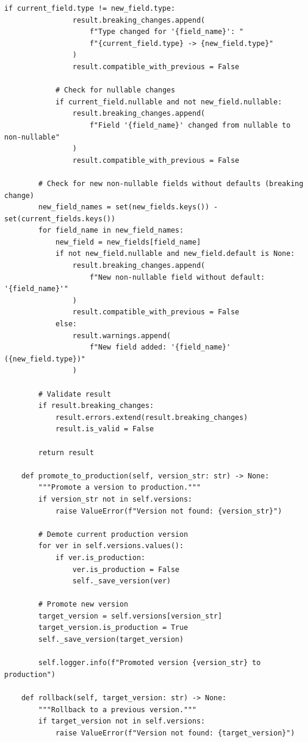 \begin{lstlisting}[style=python, caption=DataVersionManager with Semantic Versioning]
            if current_field.type != new_field.type:
                result.breaking_changes.append(
                    f"Type changed for '{field_name}': "
                    f"{current_field.type} -> {new_field.type}"
                )
                result.compatible_with_previous = False

            # Check for nullable changes
            if current_field.nullable and not new_field.nullable:
                result.breaking_changes.append(
                    f"Field '{field_name}' changed from nullable to non-nullable"
                )
                result.compatible_with_previous = False

        # Check for new non-nullable fields without defaults (breaking change)
        new_field_names = set(new_fields.keys()) - set(current_fields.keys())
        for field_name in new_field_names:
            new_field = new_fields[field_name]
            if not new_field.nullable and new_field.default is None:
                result.breaking_changes.append(
                    f"New non-nullable field without default: '{field_name}'"
                )
                result.compatible_with_previous = False
            else:
                result.warnings.append(
                    f"New field added: '{field_name}' ({new_field.type})"
                )

        # Validate result
        if result.breaking_changes:
            result.errors.extend(result.breaking_changes)
            result.is_valid = False

        return result

    def promote_to_production(self, version_str: str) -> None:
        """Promote a version to production."""
        if version_str not in self.versions:
            raise ValueError(f"Version not found: {version_str}")

        # Demote current production version
        for ver in self.versions.values():
            if ver.is_production:
                ver.is_production = False
                self._save_version(ver)

        # Promote new version
        target_version = self.versions[version_str]
        target_version.is_production = True
        self._save_version(target_version)

        self.logger.info(f"Promoted version {version_str} to production")

    def rollback(self, target_version: str) -> None:
        """Rollback to a previous version."""
        if target_version not in self.versions:
            raise ValueError(f"Version not found: {target_version}")


\end{lstlisting}
